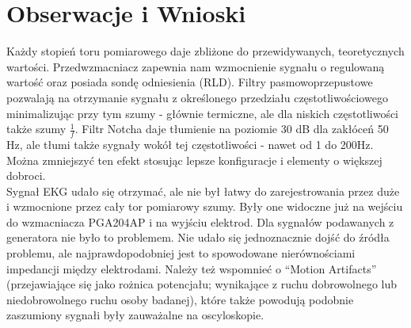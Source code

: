 \section{Obserwacje i Wnioski}
Każdy stopień toru pomiarowego daje zbliżone do przewidywanych, 
teoretycznych wartości. 
Przedwzmacniacz zapewnia nam wzmocnienie sygnału 
o regulowaną wartość oraz posiada sondę odniesienia (RLD). Filtry 
pasmowoprzepustowe pozwalają na otrzymanie sygnału z określonego 
przedziału częstotliwościowego minimalizując przy tym szumy - głównie
termiczne, ale dla niskich częstotliwości także szumy $\frac{1}{f}$. 
Filtr Notcha daje tłumienie na poziomie 30 dB dla zakłóceń 50 Hz, 
ale tłumi także sygnały wokół tej częstotliwości - nawet od 1 do 200Hz.  
Można zmniejszyć ten efekt stosując lepsze konfiguracje i elementy o 
większej dobroci. \\
Sygnał EKG udało się otrzymać, ale nie był łatwy do zarejestrowania 
przez duże i wzmocnione przez cały tor pomiarowy szumy. Były one 
widoczne już na wejściu do wzmacniacza PGA204AP i na wyjściu elektrod. 
Dla sygnałów podawanych z generatora nie było to problemem. 
Nie udało się jednoznacznie dojść do źródła problemu, ale 
najprawdopodobniej jest to spowodowane nierównościami impedancji 
między elektrodami. Należy też wspomnieć o ``Motion Artifacts'' 
(przejawiające się jako rożnica potencjału; wynikające z ruchu 
dobrowolnego lub niedobrowolnego ruchu osoby badanej), 
które także powodują podobnie zaszumiony sygnałi były zauważalne 
na oscyloskopie.